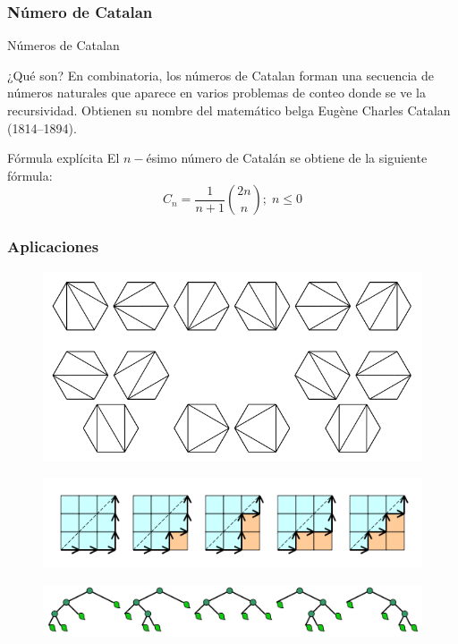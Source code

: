 \documentclass[spanish, utf8,handout]{beamer} %
\theoremstyle{definition}
\begin{document}
\subsubsection{Número de Catalan}
\begin{frame}{Números de Catalan}
\begin{alertblock}{¿Qué son?}
	En combinatoria, los números de Catalan forman una secuencia de números naturales que aparece en varios problemas de conteo donde se ve la recursividad. Obtienen su nombre del matemático belga Eugène Charles Catalan (1814–1894).
\end{alertblock}
\begin{block}{Fórmula explícita}
	El $ n- $ésimo número de Catalán se obtiene de la siguiente fórmula:
	$$
	C_{n}=\frac{1}{n+1}\binom{2n}{n}; \; n \leq 0
	$$
\end{block}

\end{frame}
\begin{frame}
	\frametitle{Aplicaciones}
\begin{example}[Triangulación]

		\begin{figure}
			\centering
			\includegraphics[scale=0.15]{ca1}
		\end{figure}
\end{example}
\begin{example}

		\begin{figure}
			\centering
			\includegraphics[scale=0.25]{ca2}
		\end{figure}
\end{example}
\begin{example}
	\begin{figure}
	\centering
	\includegraphics[scale=0.09]{ca3}
	\end{figure}
\end{example}
\end{frame}
\end{document}
